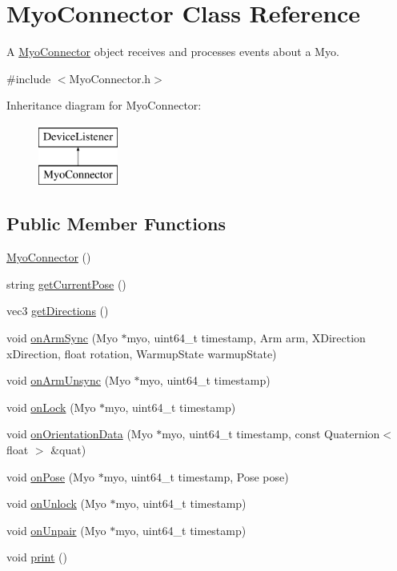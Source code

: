 \hypertarget{classMyoConnector}{}\section{Myo\+Connector Class Reference}
\label{classMyoConnector}


A \hyperlink{classMyoConnector}{Myo\+Connector} object receives and processes events about a Myo.  




{\ttfamily \#include $<$Myo\+Connector.\+h$>$}

Inheritance diagram for Myo\+Connector\+:\begin{figure}[H]
\begin{center}
\leavevmode
\includegraphics[height=2.000000cm]{classMyoConnector}
\end{center}
\end{figure}
\subsection*{Public Member Functions}
\begin{DoxyCompactItemize}
\item 
\hyperlink{classMyoConnector_a42308102b85259c441d806f94bd4caf1}{Myo\+Connector} ()
\item 
string \hyperlink{classMyoConnector_a3e5f18609811079ff25846d9b48c30b3}{get\+Current\+Pose} ()
\item 
vec3 \hyperlink{classMyoConnector_aa43b05a1bf5e27001464f2d70fcbf37e}{get\+Directions} ()
\item 
void \hyperlink{classMyoConnector_a9969e82f11eed7319a830f1cc9c7150c}{on\+Arm\+Sync} (Myo $\ast$myo, uint64\+\_\+t timestamp, Arm arm, X\+Direction x\+Direction, float rotation, Warmup\+State warmup\+State)
\item 
void \hyperlink{classMyoConnector_a3619d2595bc4e7585932aca0756d03dd}{on\+Arm\+Unsync} (Myo $\ast$myo, uint64\+\_\+t timestamp)
\item 
void \hyperlink{classMyoConnector_a64e4ea6befbf348461fe34998729da01}{on\+Lock} (Myo $\ast$myo, uint64\+\_\+t timestamp)
\item 
void \hyperlink{classMyoConnector_ae38c04a23931c6b8f789c28cdede6a08}{on\+Orientation\+Data} (Myo $\ast$myo, uint64\+\_\+t timestamp, const Quaternion$<$ float $>$ \&quat)
\item 
void \hyperlink{classMyoConnector_ab72e7aff6230ae3926c226172d1d5b7c}{on\+Pose} (Myo $\ast$myo, uint64\+\_\+t timestamp, Pose pose)
\item 
void \hyperlink{classMyoConnector_a35c2bda2592781885efdae984acfd92e}{on\+Unlock} (Myo $\ast$myo, uint64\+\_\+t timestamp)
\item 
void \hyperlink{classMyoConnector_a63c5e27ece98d6d24b2d8ff7ad230c1c}{on\+Unpair} (Myo $\ast$myo, uint64\+\_\+t timestamp)
\item 
void \hyperlink{classMyoConnector_a5c9a4a90f78daed7b7cac82cf4ea59f0}{print} ()
\end{DoxyCompactItemize}

